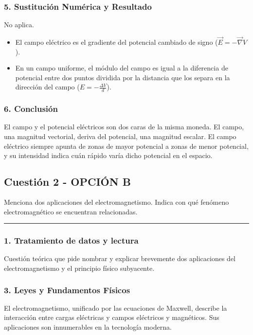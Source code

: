 \subsubsection*{5. Sustitución Numérica y Resultado}
No aplica.
\begin{cajaresultado}
\begin{itemize}
    \item El campo eléctrico es el gradiente del potencial cambiado de signo ($\vec{E} = -\vec{\nabla}V$).
    \item En un campo uniforme, el módulo del campo es igual a la diferencia de potencial entre dos puntos dividida por la distancia que los separa en la dirección del campo ($E = -\frac{\Delta V}{d}$).
\end{itemize}
\end{cajaresultado}

\subsubsection*{6. Conclusión}
\begin{cajaconclusion}
El campo y el potencial eléctricos son dos caras de la misma moneda. El campo, una magnitud vectorial, deriva del potencial, una magnitud escalar. El campo eléctrico siempre apunta de zonas de mayor potencial a zonas de menor potencial, y su intensidad indica cuán rápido varía dicho potencial en el espacio.
\end{cajaconclusion}

\newpage

\subsection{Cuestión 2 - OPCIÓN B}
\label{subsec:4B_2006_jun_ord}

\begin{cajaenunciado}
Menciona dos aplicaciones del electromagnetismo. Indica con qué fenómeno electromagnético se encuentran relacionadas.
\end{cajaenunciado}
\hrule

\subsubsection*{1. Tratamiento de datos y lectura}
Cuestión teórica que pide nombrar y explicar brevemente dos aplicaciones del electromagnetismo y el principio físico subyacente.

\subsubsection*{3. Leyes y Fundamentos Físicos}
El electromagnetismo, unificado por las ecuaciones de Maxwell, describe la interacción entre cargas eléctricas y campos eléctricos y magnéticos. Sus aplicaciones son innumerables en la tecnología moderna.


